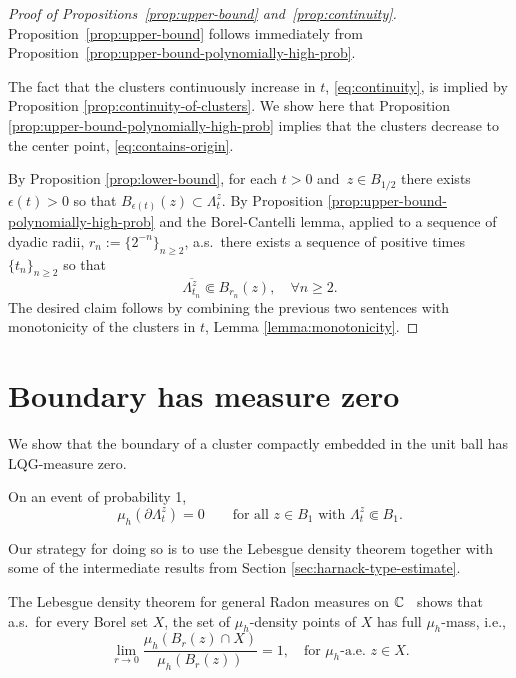\documentclass[12pt]{amsart}
\numberwithin{equation}{section}
\newcommand{\cluster}[2]{\hyperref[eq:non-co-set]{\mathit{\Lambda}^{#1}_{#2}}}
\begin{document}
	\begin{proof}[Proof of Propositions~\ref{prop:upper-bound} and~\ref{prop:continuity}]
		Proposition~\ref{prop:upper-bound} follows immediately from Proposition~\ref{prop:upper-bound-polynomially-high-prob}. 
		
		The fact that the clusters continuously increase in $t$, \eqref{eq:continuity}, is implied by Proposition \ref{prop:continuity-of-clusters}. 
		We show here that Proposition \ref{prop:upper-bound-polynomially-high-prob} implies that the clusters decrease to the center point, \eqref{eq:contains-origin}. 
		
		By Proposition \ref{prop:lower-bound}, for each $t > 0$ and~$z \in B_{1/2}$ there exists $\epsilon(t) > 0$ so that $B_{\epsilon(t)}(z) \subset {\cluster{z}{t}}$.
		By Proposition \ref{prop:upper-bound-polynomially-high-prob} and the Borel-Cantelli lemma, applied to a sequence of dyadic radii, $r_n := \{2^{-n}\}_{n \geq 2}$, 
		a.s.\ there exists a sequence of positive times $\{t_n\}_{n \geq 2}$ so that 
		\[
		\overline{{\cluster{z}{t_n}}} \Subset B_{r_n}(z), \quad \forall n \geq 2.
		\]
		The desired claim follows by combining the previous two sentences with monotonicity of the clusters in $t$, Lemma \ref{lemma:monotonicity}.
	\end{proof}
	
	
	
	
	\section{Boundary has measure zero} \label{sec:boundary-measure-zero}
	
	We show that the boundary of a cluster compactly embedded in the unit ball has LQG-measure zero. 
	\begin{prop} \label{prop:boundary-measure-zero}
		On an event of probability 1, 
		\[
		\mu_h(\partial {\cluster{z}{t}}) = 0 \qquad \mbox{for all $z \in B_{1}$ with ${\cluster{z}{t}} \Subset B_1$}.
		\]		
	\end{prop}
	Our strategy for doing so is to use the Lebesgue density theorem together with some of the intermediate results from Section \ref{sec:harnack-type-estimate}.
	
	
	The Lebesgue density theorem for general Radon measures on $\mathbb{C}$~\cite[Corollary 2.14]{mattila1999geometry} shows that a.s.\ for every Borel set $X$, the set of $\mu_h$-density points of $X$ has full $\mu_h$-mass, i.e., 
	\begin{equation} \label{eq:density-0}
	\lim_{r \to 0} \frac{\mu_h(B_r(z) \cap X)}{\mu_h(B_r(z))} = 1,\quad \text{for $\mu_h$-a.e.\ $z\in X$}. 
	\end{equation}
	
\end{document}
